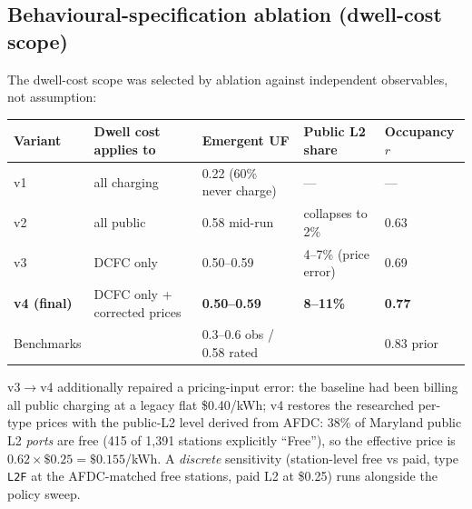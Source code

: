 \documentclass[11pt]{article}
\begin{document}
\subsection{Behavioural-specification ablation (dwell-cost scope)}
The dwell-cost scope was selected by ablation against independent observables,
not assumption:
\begin{center}\small
\begin{tabular}{lllll}
\toprule
Variant & Dwell cost applies to & Emergent UF & Public L2 share & Occupancy $r$\\
\midrule
v1 & all charging & 0.22 (60\% never charge) & --- & --- \\
v2 & all public & 0.58 mid-run & collapses to 2\% & 0.63 \\
v3 & DCFC only & 0.50--0.59 & 4--7\% (price error) & 0.69 \\
\textbf{v4 (final)} & DCFC only + corrected prices & \textbf{0.50--0.59} & \textbf{8--11\%} & \textbf{0.77} \\
\midrule
Benchmarks & & 0.3--0.6 obs / 0.58 rated & & 0.83 prior \\
\bottomrule
\end{tabular}
\end{center}
v3$\rightarrow$v4 additionally repaired a pricing-input error: the baseline had
been billing all public charging at a legacy flat \$0.40/kWh; v4 restores the
researched per-type prices with the public-L2 level derived from AFDC:
38\% of Maryland public L2 \emph{ports} are free (415 of 1{,}391 stations
explicitly ``Free''), so the effective price is $0.62\times\$0.25=\$0.155$/kWh.
A \emph{discrete} sensitivity (station-level free vs paid, type \texttt{L2F} at
the AFDC-matched free stations, paid L2 at \$0.25) runs alongside the policy
sweep.
\end{document}
